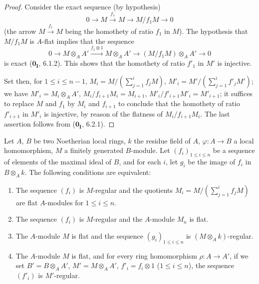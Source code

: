 \begin{proof}
Consider the exact sequence (by hypothesis)
\[
  0 \to M \xrightarrow{f_1} M \to M/f_1M \to 0
\]
(the arrow $M\xrightarrow{f_1}M$ being the homothety of ratio $f_1$ in $M$).
The hypothesis that $M/f_1M$ is $A$-flat implies that the sequence
\[
  0 \to M\otimes_AA' \xrightarrow{f_1\otimes 1} M\otimes_AA' \to (M/f_1M)\otimes_AA' \to 0
\]
is exact ($\mathbf{0_I}$, 6.1.2).
This shows that the homothety of ratio $f'_1$ in $M'$ is injective.

Set then, for $1\leq i\leq n-1$, $M_i=M/(\sum_{j=1}^i f_jM)$, $M'_i=M'/(\sum_{j=1}^i f'_jM')$;
we have $M'_i=M_i\otimes_AA'$, $M_i/f_{i+1}M_i=M_{i+1}$, $M'_i/f'_{i+1}M'_i=M'_{i+1}$;
it suffices to replace $M$ and $f_1$ by $M_i$ and $f_{i+1}$ to conclude that the homothety of ratio $f'_{i+1}$ in $M'_i$ is injective, by reason of the flatness of $M_i/f_{i+1}M_i$.
The last assertion follows from ($\mathbf{0_I}$, 6.2.1).
\end{proof}

\begin{proposition}[15.1.16]
\label{0.15.1.16}
Let $A$, $B$ be two Noetherian local rings, $k$ the residue field of $A$, $\varphi:A\to B$ a local homomorphism, $M$ a finitely generated $B$-module.
Let $(f_i)_{1\leq i\leq n}$ be a sequence of elements of the maximal ideal of $B$, and for each $i$, let $g_i$ be the image of $f_i$ in $B\otimes_Ak$.
The following conditions are equivalent:
\begin{enumerate}
  \item[a)] The sequence $(f_i)$ is $M$-regular and the quotients $M_i=M/(\sum_{j=1}^i f_jM)$ are flat $A$-modules for $1\leq i\leq n$.
  \item[b)] The sequence $(f_i)$ is $M$-regular and the $A$-module $M_n$ is flat.
  \item[c)] The $A$-module $M$ is flat and the sequence $(g_i)_{1\leq i\leq n}$ is $(M\otimes_Ak)$-regular.
  \item[d)] The $A$-module $M$ is flat, and for every ring homomorphism $\rho:A\to A'$, if we set $B'=B\otimes_AA'$, $M'=M\otimes_AA'$, $f'_i=f_i\otimes 1$ ($1\leq i\leq n$), the sequence $(f'_i)$ is $M'$-regular.
\end{enumerate}
\end{proposition}

